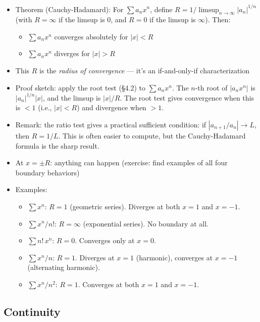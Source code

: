 \documentclass[
  10pt,
  letterpaper,
]{scrbook}
\providecommand{\tightlist}{%
  \setlength{\itemsep}{0pt}\setlength{\parskip}{0pt}}
\begin{document}
\begin{itemize}
\tightlist
\item
  Theorem (Cauchy-Hadamard): For \(\sum a_n x^n\), define
  \(R = 1 / \limsup_{n \to \infty} |a_n|^{1/n}\) (with \(R = \infty\) if
  the limsup is \(0\), and \(R = 0\) if the limsup is \(\infty\)). Then:

  \begin{itemize}
  \tightlist
  \item
    \(\sum a_n x^n\) converges absolutely for \(|x| < R\)
  \item
    \(\sum a_n x^n\) diverges for \(|x| > R\)
  \end{itemize}
\item
  This \(R\) is the \emph{radius of convergence} --- it's an
  if-and-only-if characterization
\item
  Proof sketch: apply the root test (§4.2) to \(\sum a_n x^n\). The
  \(n\)-th root of \(|a_n x^n|\) is \(|a_n|^{1/n} |x|\), and the limsup
  is \(|x|/R\). The root test gives convergence when this is \(< 1\)
  (i.e., \(|x| < R\)) and divergence when \(> 1\).
\item
  Remark: the ratio test gives a practical sufficient condition: if
  \(|a_{n+1}/a_n| \to L\), then \(R = 1/L\). This is often easier to
  compute, but the Cauchy-Hadamard formula is the sharp result.
\item
  At \(x = \pm R\): anything can happen (exercise: find examples of all
  four boundary behaviors)
\item
  Examples:

  \begin{itemize}
  \tightlist
  \item
    \(\sum x^n\): \(R = 1\) (geometric series). Diverges at both
    \(x = 1\) and \(x = -1\).
  \item
    \(\sum x^n/n!\): \(R = \infty\) (exponential series). No boundary at
    all.
  \item
    \(\sum n! \, x^n\): \(R = 0\). Converges only at \(x = 0\).
  \item
    \(\sum x^n/n\): \(R = 1\). Diverges at \(x = 1\) (harmonic),
    converges at \(x = -1\) (alternating harmonic).
  \item
    \(\sum x^n/n^2\): \(R = 1\). Converges at both \(x = 1\) and
    \(x = -1\).
  \end{itemize}
\end{itemize}

\subsection{Continuity}\label{continuity-2}
\end{document}
